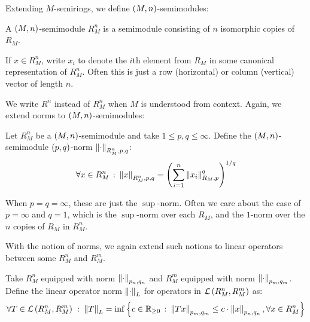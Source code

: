 Extending \(M\)-semirings,
we define \(\left(M, n\right)\)-semimodules:

\begin{definition}
  A \(\left(M, n\right)\)-semimodule \(R_M ^n\)
  is a semimodule consisting of \(n\) isomorphic copies of \(R_M\).
\end{definition}

If \(x \in R_M ^n\), write \(x_i\) to denote the \(i\)th element from
\(R_M\) in some canonical representation of \(R_M ^n\).
Often this is just a row (horizontal) or column (vertical)
vector of length \(n\).

We write \(R^n\) instead of \(R_M ^n\) when \(M\) is understood from context.
Again, we extend norms to \(\left(M, n\right)\)-semimodules:

\begin{definition}
  Let \(R_M ^n\) be a \(\left(M, n\right)\)-semimodule
  and take \(1 \leq p, q \leq \infty\).
  Define the \(\left(M, n\right)\)-semimodule \(\left(p, q\right)\)-norm
  \(\left\lVert\cdot\right\rVert_{R_M ^n, p, q}\):
  \begin{align*}
    \forall x \in R_M ^n \ \colon
      \left\lVert x\right\rVert_{R_M ^n, p, q}
        = \left(\sum_{i = 1}^{n} \left\lVert x_i\right\rVert_{R_M, p}^q\right)^{1 / q}
  \end{align*}
\end{definition}

When \(p = q = \infty\), these are just the \(\sup\)-norm.
Often we care about the case of \(p = \infty\) and \(q = 1\),
which is the \(\sup\)-norm over each \(R_M\),
and the \(1\)-norm over the \(n\) copies of \(R_M\) in \(R_M ^n\).

With the notion of norms, we again extend such notions to
linear operators between some \(R_M ^n\) and \(R_M ^m\).

\begin{definition}
  Take \(R_M ^n\) equipped with norm \(\left\lVert\cdot\right\rVert_{p_n, q_n}\)
  and \(R_M ^m\) equipped with norm \(\left\lVert\cdot\right\rVert_{p_m, q_m}\).
  Define the linear operator norm \(\left\lVert\cdot\right\rVert_L\)
  for operators in \(\mathcal{L}\left(R_M ^n, R_M ^m\right)\) as:
  \begin{align*}
    \forall T \in \mathcal{L}\left(R_M ^n, R_M ^m\right) \ \colon
      \left\lVert T\right\rVert_L =
        \inf \left\{c \in \mathbb{R}_{\geq 0} \ \colon
                \left\lVert Tx\right\rVert_{p_m, q_m} \leq c \cdot \left\lVert x\right\rVert_{p_n, q_n},
                \forall x \in R_M ^n\right\}
  \end{align*}
\end{definition}


